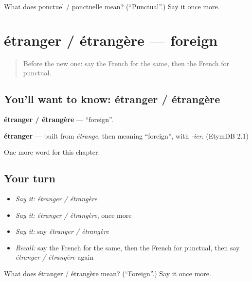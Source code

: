 \begin{tcolorbox}[breakable,colback=teal!4,colframe=teal!35!black,title={Before you move on}]
What does ponctuel / ponctuelle mean? (\textquotedblleft{}Punctual\textquotedblright{}.) Say it once more.
\end{tcolorbox}
\section[étranger / étrangère]{étranger / étrangère — foreign}

\label{lesson:FR-C220-etranger-etrangere}



\begin{quote}
Before the new one: say the French for the same, then the French for punctual.
\end{quote}

\subsection*{You'll want to know: étranger / étrangère}
\textbf{étranger / étrangère} — \textquotedblleft{}foreign\textquotedblright{}.

\begin{cousinweb}
\textbf{étranger} — built from \emph{étrange}, then meaning \textquotedblleft{}foreign\textquotedblright{}, with \emph{-ier}. (EtymDB 2.1)
\end{cousinweb}

\begin{grammarlens}[title={What you've built}]
One more word for this chapter.
\end{grammarlens}

\subsection*{Your turn}
\begin{itemize}
\raggedright
  \item \emph{Say it:} \emph{étranger / étrangère}
  \item \emph{Say it:} \emph{étranger / étrangère}, once more
  \item \emph{Say it:} say \emph{étranger / étrangère}
  \item \emph{Recall:} say the French for the same, then the French for punctual, then say \emph{étranger / étrangère} again
\end{itemize}

\begin{tcolorbox}[breakable,colback=teal!4,colframe=teal!35!black,title={Before you move on}]
What does étranger / étrangère mean? (\textquotedblleft{}Foreign\textquotedblright{}.) Say it once more.
\end{tcolorbox}
